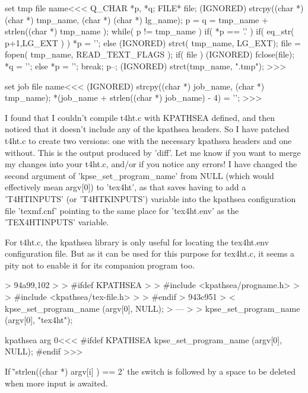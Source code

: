 {\<set tmp file name\><<<
{                                 Q_CHAR   *p, *q;
                                  FILE*    file;
   (IGNORED) strcpy((char *) (char *) tmp_name, (char *) (char *) lg_name);
   p = q = tmp_name + strlen((char *)  tmp_name );
   while( p != tmp_name ){
      if( *p == '.' ){
          if( eq_str( p+1,LG_EXT ) ) { *p = '\0'; }
          else {  
            (IGNORED) strct( tmp_name, LG_EXT);
            file =  fopen( tmp_name, READ_TEXT_FLAGS );
            if( file ){
              (IGNORED) fclose(file); *q = '\0';
            } else {  *p = '\0'; }
          } 
          break;
      }
      p--;
   }
   (IGNORED) strct(tmp_name, ".tmp");
}
>>>


\<set job file name\><<<
(IGNORED) strcpy((char *)  job_name, (char *) tmp_name); 
*(job_name + strlen((char *) job_name) - 4) = '\0';
>>>



\Verbatim
I found that I couldn't compile t4ht.c with KPATHSEA defined, and then noticed
that it doesn't include any of the kpathsea headers.  So I have patched t4ht.c
to create two versions:  one with the necessary kpathsea headers and one
without.  This is the output produced by 'diff'.  Let me know if you want to
merge my changes into your t4ht.c, and/or if you notice any errors!  I have
changed the second argument of 'kpse_set_program_name' from NULL (which would
effectively mean argv[0]) to 'tex4ht', as that saves having to add a
'T4HTINPUTS' (or 'T4HTKINPUTS') variable into the kpathsea configuration file
'texmf.cnf' pointing to the same place for 'tex4ht.env' as the 'TEX4HTINPUTS'
variable.

For t4ht.c, the kpathsea library is only useful for locating the tex4ht.env
configuration file.  But as it can be used for this purpose for tex4ht.c, it
seems a pity not to enable it for its companion program too.

> 94a99,102
> > #ifdef KPATHSEA
> > #include <kpathsea/progname.h>
> > #include <kpathsea/tex-file.h>
> > #endif
> 943c951
> <    kpse_set_program_name (argv[0], NULL);
> ---
> >    kpse_set_program_name (argv[0], "tex4ht");
\EndVerbatim

\<kpathsea arg 0\><<<
#ifdef KPATHSEA
   kpse_set_program_name (argv[0], NULL);
#endif
>>>



If \`'strlen((char *)  argv[i] ) == 2' the switch is followed by a
space to be deleted when more input is awaited.


}
